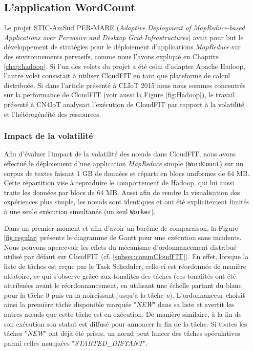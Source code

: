\subsection{L'application WordCount}

Le projet STIC-AmSud PER-MARE (\textit{Adaptive Deployment of MapReduce-based Applications over Pervasive and Desktop Grid Infrastructures}) avait pour but le développement de stratégies pour le déploiement d'applications \textit{MapReduce} sur des environnements pervasifs, comme nous l'avons expliqué en Chapitre \ref{chap:hadoop}. Si l'un des volets du projet a été celui d'adapter Apache Hadoop, l'autre volet consistait à utiliser CloudFIT en tant que plateforme de calcul distribuée. Si dans l'article présenté à CLIoT 2015 \cite{Steffenel15Taormina} nous nous sommes concentrés sur la performance de CloudFIT (voir aussi la Figure \ref{fig:Hadoop}), le travail présenté à CN4IoT \cite{Steffenel2015Roma} analysait l'exécution de CloudFIT par rapport à la volatilité et l'hétérogénéité des ressources.

\subsubsection*{Impact de la volatilité}

Afin d'évaluer l'impact de la volatilité des n{\oe}uds dans CloudFIT, nous avons effectué le déploiement d'une application \textit{MapReduce} simple (\texttt{WordCount}) sur un corpus de textes faisant 1 GB de données et réparti en blocs uniformes de 64 MB. Cette répartition vise à reproduire le comportement de Hadoop, qui lui aussi traite les données par blocs de 64 MB.  Aussi afin de rendre la visualisation des expériences plus simple, les n{\oe}uds sont identiques et ont été explicitement limités à une seule exécution simultanée (un seul \texttt{Worker}). 

Dans un premier moment et afin d'avoir un barème de comparaison, la Figure \ref{fig:regular} présente le diagramme de Gantt pour une exécution sans incidents. 
Nous pouvons apercevoir les effets du mécanisme d’ordonnancement distribué utilisé par défaut sur CloudFIT (cf. \ref{subsec:commCloudFIT}).
 En effet, lorsque la liste de tâches est reçue par le Task Scheduler, celle-ci est réordonnée de manière aléatoire, ce qui s'observe grâce aux tonalités des tâches (ces tonalités ont été attribuées avant le réordonnancement, en utilisant une échelle partant du blanc pour la tâche 0 puis en la noircissant jusqu'à la tâche \textit{n}). L'ordonnanceur choisit ainsi la première tâche disponible marquée "\textit{NEW}" dans sa liste et avertit les autres n{\oe}uds que cette tâche est en exécution. De manière similaire, à la fin de son exécution son statut est diffusé pour annoncer la fin de la tâche. Si toutes les tâches "\textit{NEW}" ont déjà été prises, un n{\oe}ud peut lancer des tâches spéculatives parmi celles marquées "\textit{STARTED\_DISTANT}". 

